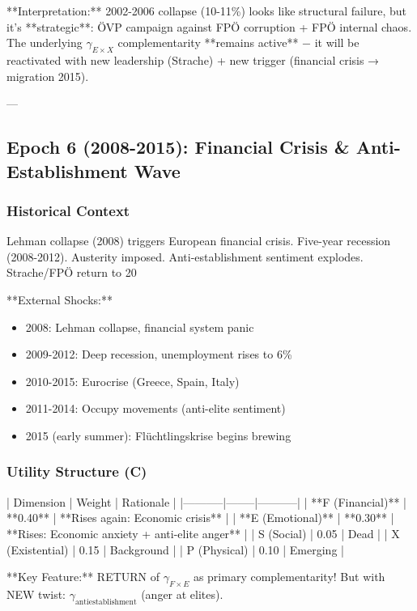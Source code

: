 **Interpretation:** 2002-2006 collapse (10-11\%) looks like structural failure, but it's **strategic**: ÖVP campaign against FPÖ corruption + FPÖ internal chaos. The underlying $\gamma_{E \times X}$ complementarity **remains active** − it will be reactivated with new leadership (Strache) + new trigger (financial crisis → migration 2015).

---

\subsection{Epoch 6 (2008-2015): Financial Crisis \& Anti-Establishment Wave}

\subsubsection{Historical Context}

Lehman collapse (2008) triggers European financial crisis. Five-year recession (2008-2012). Austerity imposed. Anti-establishment sentiment explodes. Strache/FPÖ return to 20%

**External Shocks:**
\begin{itemize}
\item 2008: Lehman collapse, financial system panic
\item 2009-2012: Deep recession, unemployment rises to 6\%
\item 2010-2015: Eurocrise (Greece, Spain, Italy)
\item 2011-2014: Occupy movements (anti-elite sentiment)
\item 2015 (early summer): Flüchtlingskrise begins brewing
\end{itemize}

\subsubsection{Utility Structure (C)}

| Dimension | Weight | Rationale |
|-----------|--------|-----------|
| **F (Financial)** | **0.40** | **Rises again: Economic crisis** |
| **E (Emotional)** | **0.30** | **Rises: Economic anxiety + anti-elite anger** |
| S (Social) | 0.05 | Dead |
| X (Existential) | 0.15 | Background |
| P (Physical) | 0.10 | Emerging |

**Key Feature:** RETURN of $\gamma_{F \times E}$ as primary complementarity! But with NEW twist: $\gamma_{\text{antiestablishment}}$ (anger at elites).

